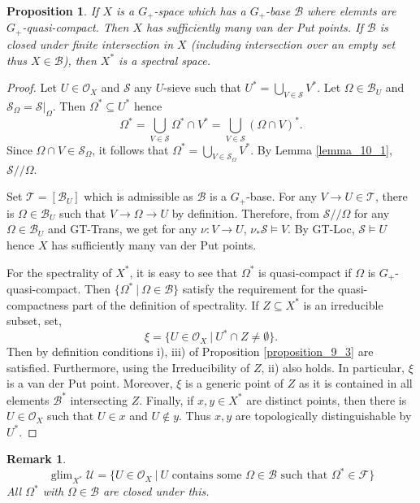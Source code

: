 \documentclass[8pt]{article}
\numberwithin{equation}{section}
\newtheorem{proposition}{Proposition}[subsection]
\newtheorem{remark}{Remark}[subsection]
\DeclareMathOperator{\glim}{glim}
\newcommand{\Ouv}{\mathscr{O}}
\newcommand{\U}[0]{\mathcal{U}}
\newcommand{\sep}[0]{\:|\:}
\newcommand{\sS}[0]{\mathscr{S}}
\newcommand{\sT}[0]{\mathscr{T}}
\newcommand{\cB}[0]{\mathcal{B}}
\begin{document}
\begin{proposition}
    If $X$ is a $G_+$-space which has a $G_+$-base $\cB$ where elemnts are $G_+$-quasi-compact. Then $X$ has sufficiently many van der Put points. 
    If $\cB$ is closed under finite intersection in $X$ (including intersection over an empty set thus $X\in\cB$), then $X^*$ is a spectral space.
\end{proposition}

\begin{proof}
    Let $U\in\Ouv_X$ and $\sS$ any $U$-sieve such that $U^* = \bigcup_{V\in\sS}V^*$. Let $\Omega\in\cB_U$ and $\sS_\Omega = \sS|_\Omega$. Then $\Omega^*\subseteq U^*$ hence 
    \begin{equation*}
        \Omega^*=\bigcup_{V\in\sS}\Omega^*\cap V^*=\bigcup_{V\in\sS}(\Omega\cap V)^*.
    \end{equation*}
    Since $\Omega\cap V\in\sS_\Omega$, it follows that $\Omega^* = \bigcup_{V\in\sS_\Omega}V^*$. By Lemma \ref{lemma_10_1}, $\sS// \Omega$.
    \par Set $\sT = [\cB_U]$ which is admissible as $\cB$ is a $G_+$-base. For any $V\to U\in\sT$, there is $\Omega\in\cB_U$ such that $V\to \Omega\to U$ by definition. Therefore, from $\sS//\Omega$ for any $\Omega\in\cB_U$ and GT-Trans, we get for any $\nu:V\to U$, $\nu_*\sS \vDash V$. By GT-Loc, $\sS\vDash U$ hence $X$ has sufficiently many van der Put points.
    \par For the spectrality of $X^*$, it is easy to see that $\Omega^*$ is quasi-compact if $\Omega$ is $G_+$-quasi-compact. Then $\{\Omega^*\sep \Omega\in\cB\}$ satisfy the requirement for the quasi-compactness part of the definition of spectrality. If $Z\subseteq X^*$ is an irreducible subset, set,
    \begin{equation*}
        \xi=\{U\in\Ouv_X\sep U^*\cap Z\not=\emptyset\}.
    \end{equation*} 
    Then by definition conditions i), iii) of Proposition \ref{proposition_9_3} are satisfied. Furthermore, using the Irreducibility of $Z$, ii) also holds. In particular, $\xi$ is a van der Put point. Moreover, $\xi$ is a generic point of $Z$ as it is contained in all elements $\cB^*$ intersecting $Z$.
    Finally, if $x,y\in X^*$ are distinct points, then there is $U\in\Ouv_X$ such that $U\in x$ and $U\not\in y$. Thus $x,y$ are topologically distinguishable by $U^*$. 
\end{proof}

\begin{remark}
    \begin{equation*}
        \glim_{X^*}\U = \{U\in\Ouv_X\sep \text{$U$ contains some $\Omega\in\cB$ such that $\Omega^*\in\mathcal{F}$}\}
    \end{equation*}
    All $\Omega^*$ with $\Omega\in\cB$ are closed under this. 
\end{remark}
\end{document}
